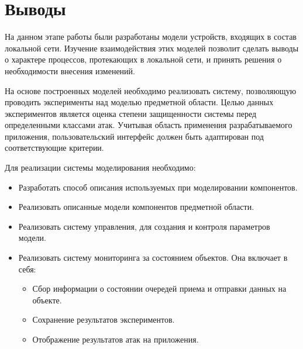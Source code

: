   

\section{Выводы}

    На данном этапе работы были разработаны модели устройств, входящих в состав локальной сети. Изучение взаимодействия этих моделей позволит сделать выводы о характере процессов, протекающих в локальной сети, и принять решения о необходимости внесения изменений. 

    На основе построенных моделей необходимо реализовать систему, позволяющую проводить эксперименты над моделью предметной области. Целью данных экспериментов является оценка степени защищенности системы перед определенными классами атак. Учитывая область применения разрабатываемого приложения, пользовательский интерфейс должен быть адаптирован под соответствующие критерии.

    Для реализации системы моделирования необходимо:

    \begin{itemize}
        \item Разработать способ описания используемых при моделировании компонентов.
        \item Реализовать описанные модели компонентов предметной области.
        \item Реализовать систему управления, для создания и контроля параметров модели.
        \item Реализовать систему мониторинга за состоянием объектов. Она включает в себя:
            \begin{itemize}
                \item Сбор информации о состоянии очередей приема и отправки данных на объекте.
                \item Сохранение результатов экспериментов.
                \item Отображение результатов атак на приложения.
            \end{itemize}
    \end{itemize}

    